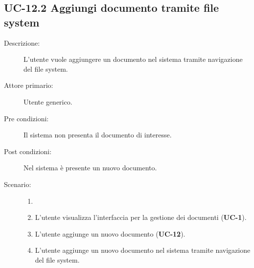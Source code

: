 \subsection{UC-12.2 Aggiungi documento tramite file system}
\begin{description}
    \item[Descrizione:] L'utente vuole aggiungere un documento nel sistema tramite navigazione del file system.
    \item[Attore primario:] Utente generico.
    \item[Pre condizioni:] Il sistema non presenta il documento di interesse.
    \item[Post condizioni:] Nel sistema è presente un nuovo documento.
    \item[Scenario:] 
    \begin{enumerate}
        \item[] 
        \item L’utente visualizza l'interfaccia per la gestione dei documenti (\textbf{UC-1}).
        \item L’utente aggiunge un nuovo documento (\textbf{UC-12}).
        \item L'utente aggiunge un nuovo documento nel sistema tramite navigazione del file system.
    \end{enumerate}
\end{description}

